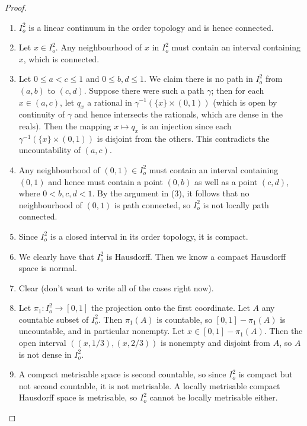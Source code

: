 \begin{proof}
  \begin{enumerate}[leftmargin=*]
  \item $I_o^2$ is a linear continuum in the order topology and is hence connected.
  \item Let $x \in I_o^2$. Any neighbourhood of $x$ in $I_o^2$ must contain an interval containing $x$, which is connected.
  \item Let $0 \le a < c \le 1$ and $0 \le b, d \le 1$. We claim there is no path in $I_o^2$ from $(a,b)$ to $(c,d)$. Suppose there were such a path $\gamma$; then for each $x \in (a,c)$, let $q_x$ a rational in $\gamma^{-1}(\{x\} \times (0,1))$ (which is open by continuity of $\gamma$ and hence intersects the rationals, which are dense in the reals). Then the mapping $x \mapsto q_x$ is an injection since each $\gamma^{-1}(\{x\} \times (0,1))$ is disjoint from the others. This contradicts the uncountability of $(a,c)$.
  \item Any neighbourhood of $(0,1) \in I_o^2$ must contain an interval containing $(0,1)$ and hence must contain a point $(0,b)$ as well as a point $(c,d)$, where $0 < b,c,d < 1$. By the argument in (3), it follows that no neighbourhood of $(0,1)$ is path connected, so $I_o^2$ is not locally path connected.
  \item Since $I_o^2$ is a closed interval in its order topology, it is compact.
  \item We clearly have that $I_o^2$ is Hausdorff. Then we know a compact Hausdorff space is normal.
  \item Clear (don't want to write all of the cases right now).
  \item Let $\pi_1 : I_o^2 \to [0,1]$ the projection onto the first coordinate. Let $A$ any countable subset of $I_o^2$. Then $\pi_1(A)$ is countable, so $[0,1] - \pi_1(A)$ is uncountable, and in particular nonempty. Let $x \in [0,1] - \pi_1(A)$. Then the open interval $((x,1/3), (x, 2/3))$ is nonempty and disjoint from $A$, so $A$ is not dense in $I_o^2$.
  \item A compact metrisable space is second countable, so since $I_o^2$ is compact but not second countable, it is not metrisable. A locally metrisable compact Hausdorff space is metrisable, so $I_o^2$ cannot be locally metrisable either. \qedhere
  \end{enumerate}
\end{proof}


